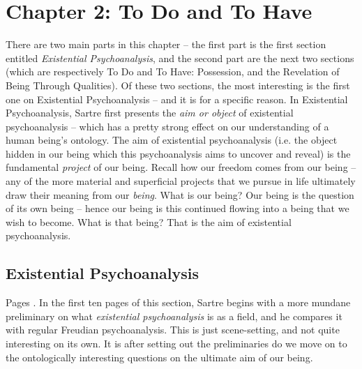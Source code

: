 \section{Chapter 2: To Do and To Have}

There are two main parts in this chapter -- the first part is the first section entitled \emph{Existential Psychoanalysis}, and the second part are the next two sections (which are respectively To Do and To Have: Possession, and the Revelation of Being Through Qualities). Of these two sections, the most interesting is the first one on Existential Psychoanalysis -- and it is for a specific reason. In Existential Psychoanalysis, Sartre first presents the \emph{aim or object} of existential psychoanalysis -- which has a pretty strong effect on our understanding of a human being's ontology. The aim of existential psychoanalysis (i.e. the object hidden in our being which this psychoanalysis aims to uncover and reveal) is the fundamental \emph{project} of our being. Recall how our freedom comes from our being -- any of the more material and superficial projects that we pursue in life ultimately draw their meaning from our \emph{being}. What is our being? Our being is the question of its own being -- hence our being is this continued flowing into a being that we wish to become. What is that being? That is the aim of existential psychoanalysis.

\subsection{Existential Psychoanalysis}

Pages \autocite[723 -- 746]{sartre}. In the first ten pages \autocite[723 -- 732]{sartre} of this section, Sartre begins with a more mundane preliminary on what \emph{existential psychoanalysis} is as a field, and he compares it with regular Freudian psychoanalysis. This is just scene-setting, and not quite interesting on its own. It is after setting out the preliminaries do we move on to the ontologically interesting questions on the ultimate aim of our being. 

